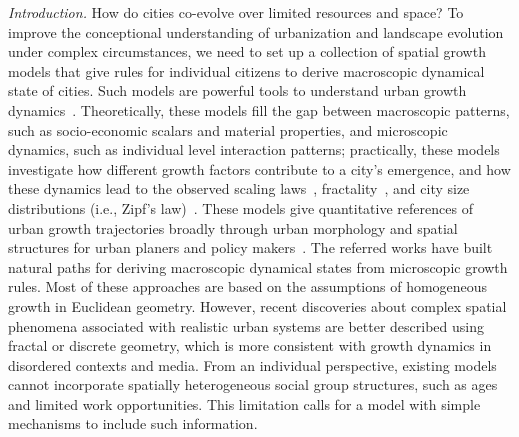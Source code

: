 \documentclass[reprint,unsortedaddress,amsmath,amssymb,aps,prl,showkeys]{revtex4-2}
\begin{document}
\textit{Introduction.} How do cities co-evolve over limited resources and space? To improve the conceptional understanding of urbanization and landscape evolution under complex circumstances, we need to set up a collection of spatial growth models that give rules for individual citizens to derive macroscopic dynamical state of cities. Such models are powerful tools to understand urban growth dynamics~\cite{PhysRevX.4.011008, Li2017Simple, makse1995modelling, rybski2013distance, nanda2017spatial}. Theoretically, these models fill the gap between macroscopic patterns, such as socio-economic scalars and material properties, and microscopic dynamics, such as individual level interaction patterns; practically, these models investigate how different growth factors contribute to a city's emergence, and how these dynamics lead to the observed scaling laws~\cite{bettencourt2007growth,court2013origins,batty2008size,batty2019urbanscalinglaw}, fractality~\cite{batty1994fractal,batty2007cities}, and city size distributions (i.e., Zipf's law)~\cite{zipf1949human}. These models give quantitative references of urban growth trajectories broadly through urban morphology and spatial structures for urban planers and policy makers~\cite{anas1998urban}. The referred works have built natural paths for deriving macroscopic dynamical states from microscopic growth rules. Most of these approaches are based on the assumptions of homogeneous growth in Euclidean geometry. However, recent discoveries about complex spatial phenomena associated with realistic urban systems are better described using fractal or discrete geometry\cite{makse1995modelling,louf2014congestion,PhysRevE.58.7054}, which is more consistent with growth dynamics in disordered contexts and media. From an individual perspective, existing models cannot incorporate spatially heterogeneous social group structures, such as ages\cite{PhysRevE.93.012112} and limited work opportunities. This limitation calls for a model with simple mechanisms to include such information.
\end{document}
